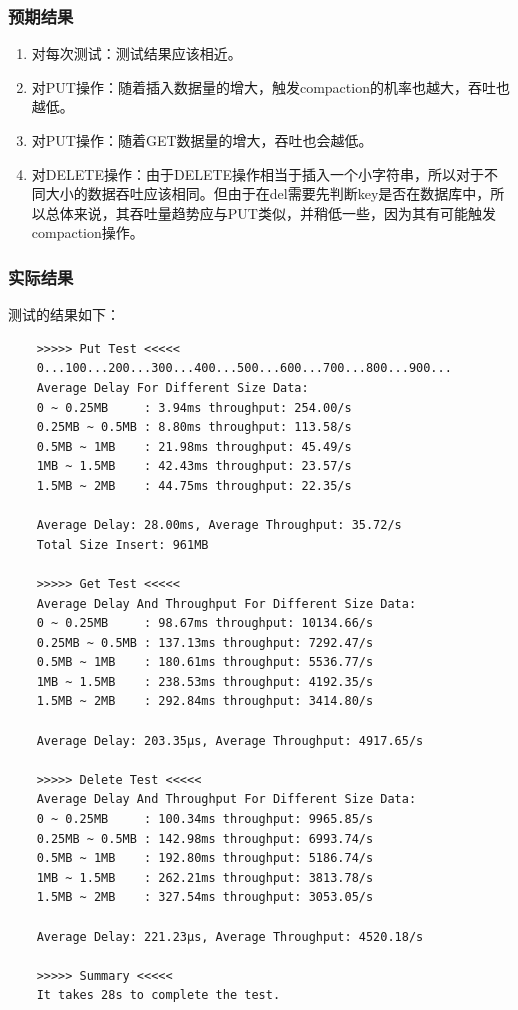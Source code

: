 \documentclass{ctexart}
\begin{document}
\subsubsection{预期结果}
\begin{enumerate}
  \item 对每次测试：测试结果应该相近。
  \item 对PUT操作：随着插入数据量的增大，触发compaction的机率也越大，吞吐也越低。
  \item 对PUT操作：随着GET数据量的增大，吞吐也会越低。
  \item 对DELETE操作：由于DELETE操作相当于插入一个小字符串，所以对于不同大小的数据吞吐应该相同。但由于在del需要先判断key是否在数据库中，所以总体来说，其吞吐量趋势应与PUT类似，并稍低一些，因为其有可能触发compaction操作。
\end{enumerate}

\subsubsection{实际结果}
测试的结果如下：
\begin{verbatim}
    >>>>> Put Test <<<<<
    0...100...200...300...400...500...600...700...800...900...
    Average Delay For Different Size Data:
    0 ~ 0.25MB     : 3.94ms throughput: 254.00/s
    0.25MB ~ 0.5MB : 8.80ms throughput: 113.58/s
    0.5MB ~ 1MB    : 21.98ms throughput: 45.49/s
    1MB ~ 1.5MB    : 42.43ms throughput: 23.57/s
    1.5MB ~ 2MB    : 44.75ms throughput: 22.35/s
    
    Average Delay: 28.00ms, Average Throughput: 35.72/s
    Total Size Insert: 961MB
    
    >>>>> Get Test <<<<<
    Average Delay And Throughput For Different Size Data:
    0 ~ 0.25MB     : 98.67ms throughput: 10134.66/s
    0.25MB ~ 0.5MB : 137.13ms throughput: 7292.47/s
    0.5MB ~ 1MB    : 180.61ms throughput: 5536.77/s
    1MB ~ 1.5MB    : 238.53ms throughput: 4192.35/s
    1.5MB ~ 2MB    : 292.84ms throughput: 3414.80/s
    
    Average Delay: 203.35µs, Average Throughput: 4917.65/s
    
    >>>>> Delete Test <<<<<
    Average Delay And Throughput For Different Size Data:
    0 ~ 0.25MB     : 100.34ms throughput: 9965.85/s
    0.25MB ~ 0.5MB : 142.98ms throughput: 6993.74/s
    0.5MB ~ 1MB    : 192.80ms throughput: 5186.74/s
    1MB ~ 1.5MB    : 262.21ms throughput: 3813.78/s
    1.5MB ~ 2MB    : 327.54ms throughput: 3053.05/s
    
    Average Delay: 221.23µs, Average Throughput: 4520.18/s
    
    >>>>> Summary <<<<<
    It takes 28s to complete the test.
\end{verbatim}
\end{document}

